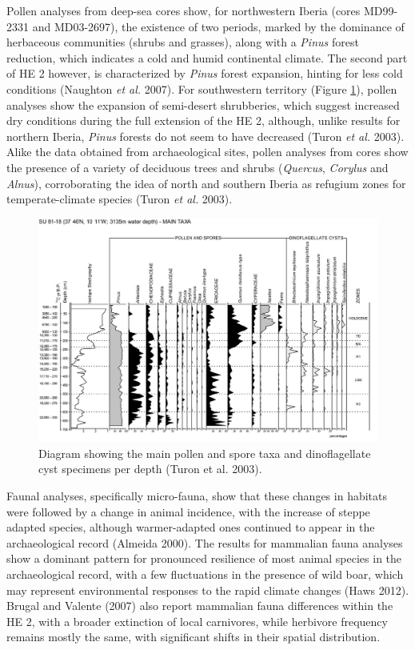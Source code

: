 \documentclass[12pt,twoside]{reedthesis}
\begin{document}
Pollen analyses from deep-sea cores show, for northwestern Iberia (cores MD99-2331 and MD03-2697), the existence of two periods, marked by the dominance of herbaceous communities (shrubs and grasses), along with a \emph{Pinus} forest reduction, which indicates a cold and humid continental climate. The second part of HE 2 however, is characterized by \emph{Pinus} forest expansion, hinting for less cold conditions (Naughton \emph{et al.} 2007). For southwestern territory (Figure \ref{fig:su8118}), pollen analyses show the expansion of semi-desert shrubberies, which suggest increased dry conditions during the full extension of the HE 2, although, unlike results for northern Iberia, \emph{Pinus} forests do not seem to have decreased (Turon \emph{et al.} 2003). Alike the data obtained from archaeological sites, pollen analyses from cores show the presence of a variety of deciduous trees and shrubs (\emph{Quercus}, \emph{Corylus} and \emph{Alnus}), corroborating the idea of north and southern Iberia as refugium zones for temperate-climate species (Turon \emph{et al.} 2003).
\begin{figure}[H]

{\centering \includegraphics[width=0.8\linewidth]{figure/Turon2003_SU81-18} 

}

\caption{Diagram showing the main pollen and spore taxa and dinoflagellate cyst specimens per depth (Turon et al. 2003).}\label{fig:su8118}
\end{figure}
Faunal analyses, specifically micro-fauna, show that these changes in habitats were followed by a change in animal incidence, with the increase of steppe adapted species, although warmer-adapted ones continued to appear in the archaeological record (Almeida 2000). The results for mammalian fauna analyses show a dominant pattern for pronounced resilience of most animal species in the archaeological record, with a few fluctuations in the presence of wild boar, which may represent environmental responses to the rapid climate changes (Haws 2012). Brugal and Valente (2007) also report mammalian fauna differences within the HE 2, with a broader extinction of local carnivores, while herbivore frequency remains mostly the same, with significant shifts in their spatial distribution.
\end{document}
